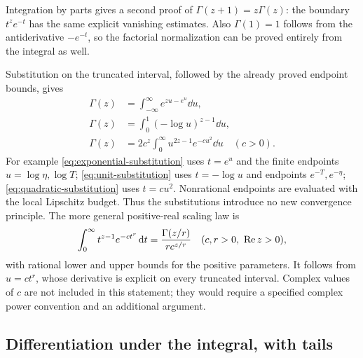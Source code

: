 Integration by parts gives a second proof of
$\Gamma(z+1)=z\Gamma(z)$: the boundary $t^ze^{-t}$ has the same
explicit vanishing estimates. Also $\Gamma(1)=1$ follows from the
antiderivative $-e^{-t}$, so the factorial normalization can be proved
entirely from the integral as well.

Substitution on the truncated interval, followed by the already proved
endpoint bounds, gives
\begin{align}
 \Gamma(z)&=\int_{-\infty}^{\infty}e^{zu-e^u}\dd u,
 \label{eq:exponential-substitution}\\
 \Gamma(z)&=\int_0^1(-\log u)^{z-1}\dd u,
 \label{eq:unit-substitution}\\
 \Gamma(z)&=2c^z\int_0^\infty u^{2z-1}e^{-cu^2}\dd u
 \quad(c>0).\label{eq:quadratic-substitution}
\end{align}
For example \eqref{eq:exponential-substitution} uses
$t=e^u$ and the finite endpoints $u=\log\eta,\log T$;
\eqref{eq:unit-substitution} uses $t=-\log u$ and endpoints
$e^{-T},e^{-\eta}$; \eqref{eq:quadratic-substitution} uses
$t=cu^2$. Nonrational endpoints are evaluated with the local Lipschitz
budget. Thus the substitutions introduce no new convergence principle.
The more general positive-real scaling law is
\begin{equation}
 \int_0^\infty t^{z-1}e^{-ct^r}\,\mathrm d t
 =\frac{\Gamma(z/r)}{r c^{z/r}}\quad(c,r>0,\ \operatorname{Re} z>0),
 \label{eq:general-scaling}
\end{equation}
with rational lower and upper bounds for the positive parameters.
It follows from $u=ct^r$, whose derivative is explicit on every
truncated interval. Complex values of $c$ are not included in this
statement; they would require a specified complex power convention and
an additional argument.

\subsection{Differentiation under the integral, with tails}

